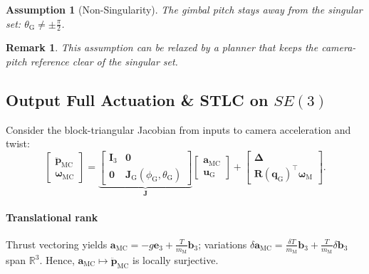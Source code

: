 \documentclass[letterpaper, 10 pt, conference]{ieeeconf}  %
\newtheorem{remark}{Remark}
\newtheorem{assumption}{Assumption}
\begin{document}
\begin{assumption}[Non-Singularity]
\label{ass:non_singularity}
The gimbal pitch stays away from the singular set: $\theta_\text{G} \neq \pm \frac{\pi}{2}$.
\end{assumption}

\begin{remark}
This assumption can be relaxed by a planner that keeps the camera-pitch reference clear of the singular set.
\end{remark}

\subsection{Output Full Actuation \& STLC on $SE(3)$}
\label{ssec:controllability}

Consider the block-triangular Jacobian from inputs to camera acceleration and twist:
\begin{equation}
\label{eq:J_block}
\begin{bmatrix} \ddot{\mathbf{p}}_\text{MC} \\ \boldsymbol{\omega}_\text{MC} \end{bmatrix} =
\underbrace{\begin{bmatrix} \mathbf{I}_3 & \mathbf{0} \\ \mathbf{0} & \mathbf{J}_\text{G}(\phi_\text{G},\theta_\text{G})\end{bmatrix}}_{\mathbf{J}} \begin{bmatrix} \mathbf{a}_\text{MC} \\ \mathbf{u}_\text{G} \end{bmatrix} + \begin{bmatrix} \boldsymbol\Delta \\ \mathbf{R}(\mathbf{q}_\text{G})^\top\boldsymbol{\omega}_\text{M} \end{bmatrix}.
\end{equation}

\paragraph{Translational rank}
Thrust vectoring yields $\mathbf{a}_\text{MC} = -g \mathbf{e}_3 + \frac{T}{m_\text{M}} \mathbf{b}_3$; variations $\delta \mathbf{a}_\text{MC} = \frac{\delta T}{m_\text{M}} \mathbf{b}_3 + \frac{T}{m_\text{M}} \delta \mathbf{b}_3$ span $\mathbb{R}^3$. Hence, $\mathbf{a}_\text{MC} \mapsto \ddot{\mathbf{p}}_\text{MC}$ is locally surjective.
\end{document}
